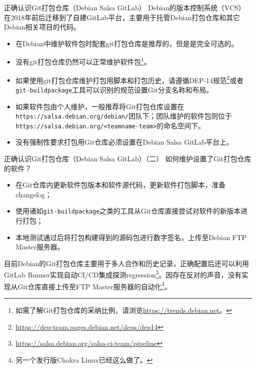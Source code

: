 
\begin{frame}{正确认识Git打包仓库（Debian Salsa GitLab）}
	Debian的版本控制系统（VCS）在2018年前后迁移到了自建GitLab平台，主要用于托管Debian打包仓库和其它Debian相关项目的代码。
	\begin{itemize}
		\item 在Debian中维护软件包时配套git打包仓库是推荐的，但是是完全可选的。
		\item 没有git打包仓库仍然可以正常维护软件包\footnote{如需了解Git打包仓库的采纳比例，请浏览\url{https://trends.debian.net}。}。
		\item 如果使用git打包仓库维护打包用脚本和打包历史，请遵循DEP-14规范\footnote{\url{https://dep-team.pages.debian.net/deps/dep14}}或者\texttt{git-buildpackage}工具可以识别的规范设置Git分支名称和布局。
        \item     如果软件包由个人维护，一般推荐将Git打包仓库设置在\texttt{https://salsa.debian.org/debian/}团队下；团队维护的软件包则位于\texttt{https://salsa.debian.org/<teamname-team>}的命名空间下。
        \item 没有强制性要求打包用Git仓库必须设置在Debian Salsa GitLab平台上。
    \end{itemize}
\end{frame}

\begin{frame}{正确认识Git打包仓库（Debian Salsa GitLab）（二）}
	如何维护设置了Git打包仓库的软件？
	\begin{itemize}
		\item 在Git仓库内更新软件包版本和软件源代码，更新软件打包脚本，准备changelog；
		\item 使用诸如\texttt{git-buildpackage}之类的工具从Git仓库直接尝试对软件的新版本进行打包；
		\item 本地测试通过后将打包构建得到的源码包进行数字签名，上传至Debian FTP Master服务器。
	\end{itemize}

    \vfill

    目前Debian的Git打包仓库主要用于多人合作和历史记录，正确配置后还可以利用GitLab Runner实现自动CI/CD集成探测regression\footnote{\url{https://salsa.debian.org/salsa-ci-team/pipeline}}。因存在反对的声音，没有实现从Git仓库直接上传至FTP Master服务器的自动化\footnote{另一个发行版Chakra Linux已经这么做了。}。
\end{frame}